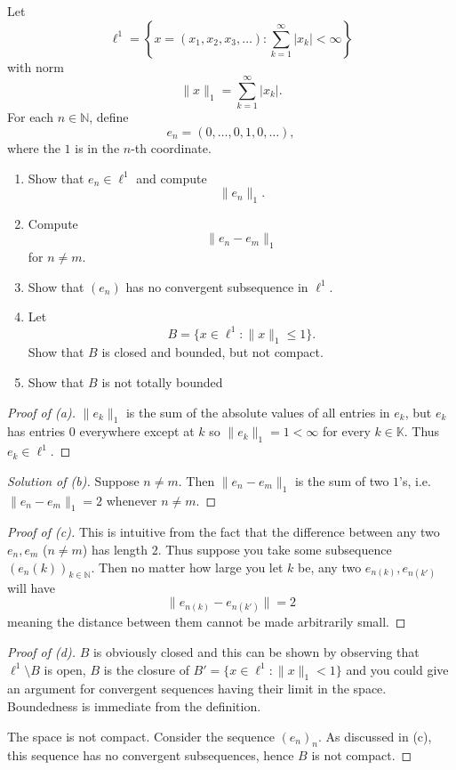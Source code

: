 \begin{prob}
    Let 
    \[
        \ell^1 = 
        \left\{x = (x_1,x_2,x_3,\ldots) : \sum_{k=1}^\infty 
        |x_k| < \infty\right\}
    \]
    with norm 
    \[
        \|x\|_1 = \sum_{k=1}^\infty |x_k|.
    \]
    For each $n \in \mathbb N$, define 
    \[
        e_n = (0,\ldots,0,1,0,\ldots),
    \]
    where the $1$ is in the $n$-th coordinate.

    \begin{enumerate}[label=\alph*)]
        \item Show that $e_n \in \ell^1$ and compute 
            \[
                \|e_n\|_1. 
            \] 
        \item Compute 
            \[
                \|e_n-e_m\|_1
            \]
            for $n \neq m$. 
        \item Show that $(e_n)$ has no convergent subsequence 
            in $\ell^1$. 
        \item Let 
            \[
                B = \{x \in \ell^1 : \|x\|_1 \leq 1\}.
            \]
            Show that $B$ is closed and bounded, but not 
            compact. 
        \item Show that $B$ is not totally bounded
    \end{enumerate}
\end{prob}
\begin{proof}[Proof of (a)]
    $\|e_k\|_1$ is the sum of the absolute values of all entries 
    in $e_k$, but $e_k$ has entries $0$ everywhere except at 
    $k$ so $\|e_k\|_1 = 1 < \infty$ for every $k \in \mathbb K$.
    Thus $e_k \in \ell^1$.
\end{proof}
\begin{proof}[Solution of (b)]
    Suppose $n \neq m$. Then 
    $\|e_n-e_m\|_1$ is the sum of two $1$'s, i.e. $\|e_n-e_m\|_1 = 2$
    whenever $n \neq m$.
\end{proof}
\begin{proof}[Proof of (c)]
    This is intuitive from the fact that the 
    difference between any two $e_n,e_m$ ($n \neq m$) has 
    length $2$. Thus suppose you take some subsequence 
    $(e_n(k))_{k\in\mathbb N}$. Then no matter how large you let 
    $k$ be, any two $e_{n(k)}, e_{n(k')}$ will have 
    \[
        \|e_{n(k)} - e_{n(k')}\| = 2
    \]
    meaning the distance between them cannot be made arbitrarily 
    small. 
\end{proof}
\begin{proof}[Proof of (d)]
    $B$ is obviously closed and this can be shown by observing 
    that $\ell^1 \setminus B$ is open, $B$ is the closure of 
    $B' = \{x \in \ell^1 : \|x\|_1 < 1\}$ and 
    you could give an argument for convergent sequences having 
    their limit in the space. 
    Boundedness is immediate from the definition.

    The space is not compact. Consider the sequence 
    $(e_n)_n$. As discussed in (c), this sequence has no convergent 
    subsequences, hence $B$ is not compact. 
\end{proof}
